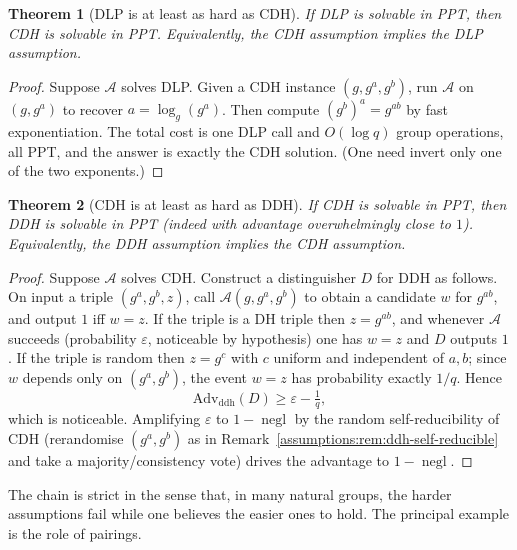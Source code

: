 \documentclass[11pt,a4paper]{article}
\newtheorem{theorem}{Theorem}[section]
\theoremstyle{definition}
\theoremstyle{remark}
\DeclareMathOperator{\negl}{negl}
\begin{document}
\begin{theorem}[DLP is at least as hard as CDH]
\label{assumptions:thm:dlp-le-cdh}
If DLP is solvable in PPT, then CDH is solvable in PPT. Equivalently, the CDH assumption implies the DLP assumption.
\end{theorem}

\begin{proof}
Suppose \(\mathcal A\) solves DLP. Given a CDH instance \((g, g^a, g^b)\), run \(\mathcal A\) on \((g, g^a)\) to recover \(a = \log_g(g^a)\). Then compute \((g^b)^a = g^{ab}\) by fast exponentiation. The total cost is one DLP call and \(O(\log q)\) group operations, all PPT, and the answer is exactly the CDH solution. (One need invert only one of the two exponents.)
\end{proof}

\begin{theorem}[CDH is at least as hard as DDH]
\label{assumptions:thm:cdh-le-ddh}
If CDH is solvable in PPT, then DDH is solvable in PPT (indeed with advantage overwhelmingly close to \(1\)). Equivalently, the DDH assumption implies the CDH assumption.
\end{theorem}

\begin{proof}
Suppose \(\mathcal A\) solves CDH. Construct a distinguisher \(D\) for DDH as follows. On input a triple \((g^a, g^b, z)\), call \(\mathcal A(g, g^a, g^b)\) to obtain a candidate \(w\) for \(g^{ab}\), and output \(1\) iff \(w = z\). If the triple is a DH triple then \(z = g^{ab}\), and whenever \(\mathcal A\) succeeds (probability \(\varepsilon\), noticeable by hypothesis) one has \(w = z\) and \(D\) outputs \(1\). If the triple is random then \(z = g^c\) with \(c\) uniform and independent of \(a, b\); since \(w\) depends only on \((g^a, g^b)\), the event \(w = z\) has probability exactly \(1/q\). Hence
\[
\mathrm{Adv}_{\mathrm{ddh}}(D) \ge \varepsilon - \tfrac{1}{q},
\]
which is noticeable. Amplifying \(\varepsilon\) to \(1 - \negl\) by the random self-reducibility of CDH (rerandomise \((g^a,g^b)\) as in Remark~\ref{assumptions:rem:ddh-self-reducible} and take a majority/consistency vote) drives the advantage to \(1 - \negl\).
\end{proof}

The chain is strict in the sense that, in many natural groups, the harder assumptions fail while one believes the easier ones to hold. The principal example is the role of pairings.
\end{document}
